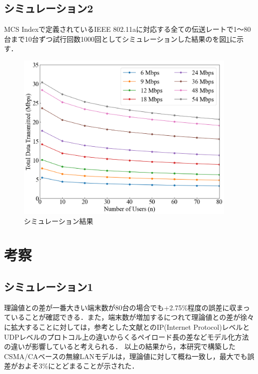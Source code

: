 \documentclass[a4paper,10pt]{ltjsarticle}
\begin{document}
\clearpage
\subsection{シミュレーション2}

MCS Indexで定義されているIEEE 802.11aに対応する全ての伝送レートで1～80台まで10台ずつ試行回数1000回としてシミュレーションした結果のを図\ref{fig:simulation-result-mcs-index}に示す．


\begin{figure}[H]
  \centering
  \includegraphics[width=0.95\textwidth]{./assets/mcs_index.png}
  \caption{シミュレーション結果}
  \label{fig:simulation-result-mcs-index}
\end{figure}

\clearpage
\section{考察}

\subsection{シミュレーション1}
理論値との差が一番大きい端末数が80台の場合でも+2.75\%程度の誤差に収まっていることが確認できる．また，端末数が増加するにつれて理論値との差が徐々に拡大することに対しては，参考とした文献\cite{paper}とのIP(Internet Protocol)レベルとUDPレベルのプロトコル上の違いからくるペイロード長の差などモデル化方法の違いが影響していると考えられる．
以上の結果から，本研究で構築したCSMA/CAベースの無線LANモデルは，理論値に対して概ね一致し，最大でも誤差がおよそ3\%にとどまることが示された．
\end{document}
